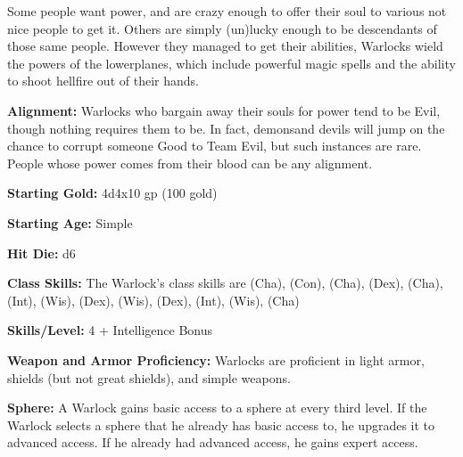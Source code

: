 
Some people want power, and are crazy enough to offer their soul to various not nice people to get it. Others are simply (un)lucky enough to be descendants of those same people. However they managed to get their abilities, Warlocks wield the powers of the lowerplanes, which include powerful magic spells and the ability to shoot hellfire out of their hands.

\textbf{Alignment:} Warlocks who bargain away their souls for power tend to be Evil, though nothing requires them to be. In fact, demonsand devils will jump on the chance to corrupt someone Good to Team Evil, but such instances are rare. People whose power comes from their blood can be any alignment.

\textbf{Starting Gold:} 4d4x10 gp (100 gold)

\textbf{Starting Age:} Simple

\textbf{Hit Die:} d6

\textbf{Class Skills:} The Warlock's class skills are  (Cha),  (Con),  (Cha),  (Dex),  (Cha),  (Int),  (Wis),  (Dex),  (Wis),  (Dex),  (Int),  (Wis),  (Cha)

\textbf{Skills/Level:} 4 + Intelligence Bonus

\poorbab{}
\poorfor{}
\goodref{}
\poorwil{}

\begin{classtable}
\end{classtable}

\classfeatures

\textbf{Weapon and Armor Proficiency:} Warlocks are proficient in light armor, shields (but not great shields), and simple weapons.

\textbf{Sphere:} A Warlock gains basic access to a sphere at every third level. If the Warlock selects a sphere that he already has basic access to, he upgrades it to advanced access. If he already had advanced access, he gains expert access.

